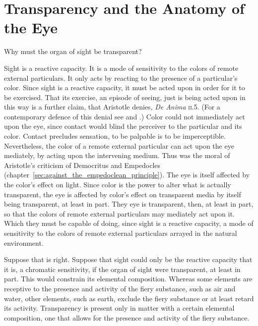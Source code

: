 
\section{Transparency and the Anatomy of the Eye} %
\label{sec:transparency_and_the_anatomy_of_the_eye}

Why must the organ of sight be transparent?

Sight is a reactive capacity. It is a mode of sensitivity to the colors of remote external particulars. It only acts by reacting to the presence of a particular's color. Since sight is a reactive capacity, it must be acted upon in order for it to be exercised. That its exercise, an episode of seeing, just is being acted upon in this way is a further claim, that Aristotle denies, \emph{De Anima} \textsc{ii}.5. (For a contemporary defence of this denial see \citealt{Travis:2009fk} and \citealt{Kalderon:2012fk}.) Color could not immediately act upon the eye, since contact would blind the perceiver to the particular and its color. Contact precludes sensation, to be palpable is to be imperceptible. Nevertheless, the color of a remote external particular can act upon the eye mediately, by acting upon the intervening medium. Thus was the moral of Aristotle's criticism of Democritus and Empedocles (chapter~\ref{sec:against_the_empedoclean_principle}). The eye is itself affected by the color's effect on light. Since color is the power to alter what is actually transparent, the eye is affected by color's effect on transparent media by itself being transparent, at least in part. They eye is transparent, then, at least in part, so that the colors of remote external particulars may mediately act upon it. Which they must be capable of doing, since sight is a reactive capacity, a mode of sensitivity to the colors of remote external particulars arrayed in the natural environment.

Suppose that is right. Suppose that sight could only be the reactive capacity that it is, a chromatic sensitivity, if the organ of sight were transparent, at least in part. This would constrain its elemental composition. Whereas some elements are receptive to the presence and activity of the fiery substance, such as air and water, other elements, such as earth, exclude the fiery substance or at least retard its activity. Transparency is present only in matter with a certain elemental composition, one that allows for the presence and activity of the fiery substance.

